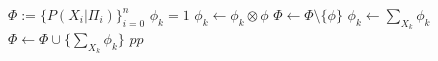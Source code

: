 \begin{algorithm}
\caption{VE algorithm
\vskip 0.6mm [INPUT] a CN specification, an evidence $(x_{n-n_e},\ldots,x_n)$%
\vskip 0.6mm [OUTPUT] $K(X_o|x_{n-n_e},\ldots,x_n)$} %
\begin{algorithmic}[1]
\State $\Phi := \{ P(X_i|\Pi_i) \}_{i=0}^n$ 
\State $\phi_k =1$ %
\For{$\phi \in \Phi$}
\State $\phi_k \gets \phi_k \otimes \phi$
\State $\Phi \gets \Phi \setminus \{ \phi \}$
\EndIf
\EndFor
\EndFor
{}
\State $\phi_k \gets \sum_{X_k} \phi_k $
\EndIf
\State $\Phi \gets \Phi \cup \{ \sum_{X_k} \phi_k \}$
 $pp$ 
\end{algorithmic}
\end{algorithm}

